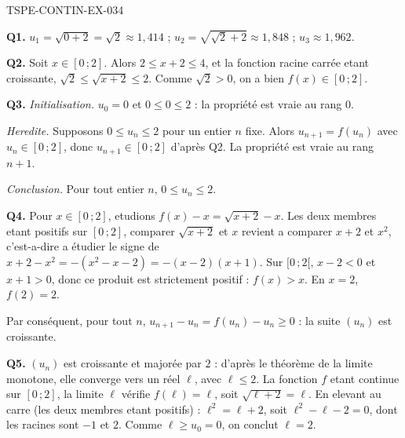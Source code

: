 \begin{corrige}{TSPE-CONTIN-EX-034}

\textbf{Q1.} $u_1 = \sqrt{0+2} = \sqrt2 \approx 1{,}414$ ; $u_2 = \sqrt{\sqrt2 + 2} \approx 1{,}848$ ; $u_3 \approx 1{,}962$.

\textbf{Q2.} Soit $x \in [0\,;2]$. Alors $2 \leq x + 2 \leq 4$, et la fonction racine carrée etant croissante, $\sqrt2 \leq \sqrt{x+2} \leq 2$. Comme $\sqrt2 > 0$, on a bien $f(x) \in [0\,;2]$.

\textbf{Q3.} \emph{Initialisation.} $u_0 = 0$ et $0 \leq 0 \leq 2$ : la propriété est vraie au rang $0$.

\emph{Heredite.} Supposons $0 \leq u_n \leq 2$ pour un entier $n$ fixe. Alors $u_{n+1} = f(u_n)$ avec $u_n \in [0\,;2]$, donc $u_{n+1} \in [0\,;2]$ d'après Q2. La propriété est vraie au rang $n+1$.

\emph{Conclusion.} Pour tout entier $n$, $0 \leq u_n \leq 2$.

\textbf{Q4.} Pour $x \in [0\,;2]$, etudions $f(x) - x = \sqrt{x+2} - x$. Les deux membres etant positifs sur $[0\,;2]$, comparer $\sqrt{x+2}$ et $x$ revient a comparer $x+2$ et $x^2$, c'est-a-dire a étudier le signe de $x + 2 - x^2 = -(x^2 - x - 2) = -(x-2)(x+1)$. Sur $[0\,;2[$, $x - 2 < 0$ et $x + 1 > 0$, donc ce produit est strictement positif : $f(x) > x$. En $x = 2$, $f(2) = 2$.

Par conséquent, pour tout $n$, $u_{n+1} - u_n = f(u_n) - u_n \geq 0$ : la suite $(u_n)$ est croissante.

\textbf{Q5.} $(u_n)$ est croissante et majorée par $2$ : d'après le théorème de la limite monotone, elle converge vers un réel $\ell$, avec $\ell \leq 2$. La fonction $f$ etant continue sur $[0\,;2]$, la limite $\ell$ vérifie $f(\ell) = \ell$, soit $\sqrt{\ell+2} = \ell$. En elevant au carre (les deux membres etant positifs) : $\ell^2 = \ell + 2$, soit $\ell^2 - \ell - 2 = 0$, dont les racines sont $-1$ et $2$. Comme $\ell \geq u_0 = 0$, on conclut $\ell = 2$.
\end{corrige}
